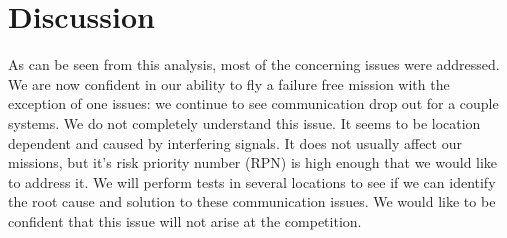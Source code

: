 \documentclass[]{auvsi_doc}
\begin{document}
\section{Discussion}
As can be seen from this analysis, most of the concerning issues were addressed. We are now confident in our ability to fly a failure free mission with the exception of one issues: we continue to see communication drop out for a couple systems. We do not completely understand this issue. It seems to be location dependent and caused by interfering signals. It does not usually affect our missions, but it's risk priority number (RPN) is high enough that we would like to address it. We will perform tests in several locations to see if we can identify the root cause and solution to these communication issues. We would like to be confident that this issue will not arise at the competition.
\end{document}
